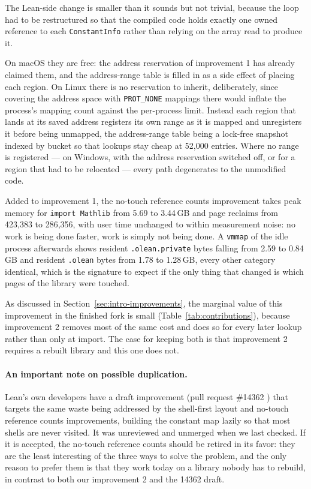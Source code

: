 \documentclass{article}
\newcommand{\Lean}{Lean\xspace}      %
\begin{document}
The \Lean-side change is smaller than it sounds but not trivial, because the loop had to be restructured so that the compiled code holds exactly one owned reference to each \texttt{ConstantInfo} rather than relying on the array read to produce it.

On macOS they are free: the address reservation of improvement 1 has already claimed them, and the address-range table is filled in as a side effect of placing each region. On Linux there is no reservation to inherit, deliberately, since covering the address space with \texttt{PROT\_NONE} mappings there would inflate the process's mapping count against the per-process limit. Instead each region that lands at its saved address registers its own range as it is mapped and unregisters it before being unmapped, the address-range table being a lock-free snapshot indexed by bucket so that lookups stay cheap at 52{,}000 entries. Where no range is registered --- on Windows, with the address reservation switched off, or for a region that had to be relocated --- every path degenerates to the unmodified code.

Added to improvement 1, the no-touch reference counts improvement takes peak memory for \texttt{import Mathlib} from 5.69 to 3.44\,GB and page reclaims from 423{,}383 to 286{,}356, with user time unchanged to within measurement noise: no work is being done faster, work is simply not being done. A \texttt{vmmap} of the idle process afterwards shows resident \texttt{.olean.private} bytes falling from 2.59 to 0.84\,GB and resident \texttt{.olean} bytes from 1.78 to 1.28\,GB, every other category identical, which is the signature to expect if the only thing that changed is which pages of the library were touched.

As discussed in Section~\ref{sec:intro-improvements}, the marginal value of this improvement in the finished fork is small (Table~\ref{tab:contributions}), because improvement 2 removes most of the same cost and does so for every later lookup rather than only at import. The case for keeping both is that improvement 2 requires a rebuilt library and this one does not.

\paragraph{An important note on possible duplication.}
\Lean's own developers have a draft improvement (pull request \#14362 \cite{lean14362}) that targets the same waste being addressed by the shell-first layout and no-touch reference counts improvements, building the constant map lazily so that most shells are never visited. It was unreviewed and unmerged when we last checked. If it is accepted, the no-touch reference counts should be retired in its favor: they are the least interesting of the three ways to solve the problem, and the only reason to prefer them is that they work today on a library nobody has to rebuild, in contrast to both our improvement 2 and the 14362 draft.
\end{document}
